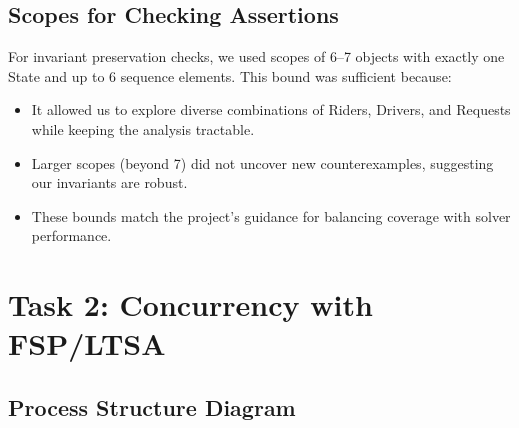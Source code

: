 \documentclass[11pt]{article}
\begin{document}
\subsection{Scopes for Checking Assertions}

For invariant preservation checks, we used scopes of 6–7 objects with exactly one State and up to 6 sequence elements. 
This bound was sufficient because:
\begin{itemize}[leftmargin=1.5em]
  \item It allowed us to explore diverse combinations of Riders, Drivers, and Requests while keeping the analysis tractable.
  \item Larger scopes (beyond 7) did not uncover new counterexamples, suggesting our invariants are robust.
  \item These bounds match the project’s guidance for balancing coverage with solver performance.
\end{itemize}

\section{Task 2: Concurrency with FSP/LTSA}
\label{sec:task2}

\subsection{Process Structure Diagram}
\end{document}
